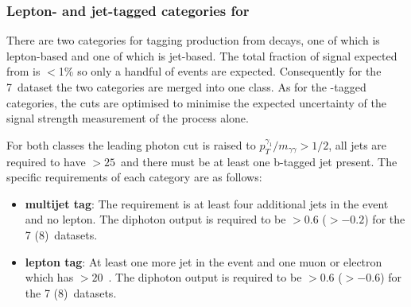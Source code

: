 \subsubsection{Lepton- and jet-tagged categories for \ttH}
\label{sec:tth_tag}

There are two categories for tagging production from \ttH decays, one of which is lepton-based and one of which is jet-based. The total fraction of signal expected from \ttH is $<$1\% so only a handful of events are expected. Consequently for the 7~\TeV dataset the two categories are merged into one class. As for the \VH-tagged categories, the cuts are optimised to minimise the expected uncertainty of the signal strength measurement of the \ttH process alone.

For both classes the leading photon \pT cut is raised to $p_{T}^{\gamma_{1}}/m_{\gamma\gamma}>1/2$, all jets are required to have \pT$>25$~\GeV and there must be at least one b-tagged jet present. The specific requirements of each category are as follows:

\begin{itemize}
  \item \textbf{\ttH multijet tag}: The requirement is at least four additional jets in the event and no lepton. The diphoton \BDT output is required to be $>0.6$ ($>-0.2$) for the 7 (8)~\TeV datasets. 
  \item \textbf{\ttH lepton tag}: At least one more jet in the event and one muon or electron which has \pT$>20$~\GeV. The diphoton \BDT output is required to be $>0.6$ ($>-0.6$) for the 7 (8)~\TeV datasets.  
\end{itemize}



